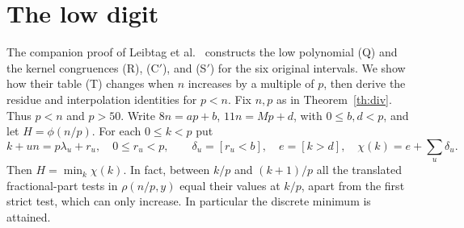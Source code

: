 \documentclass[11pt]{article}
\begin{document}
\section{The low digit}
The companion proof of Leibtag et al.\ \cite{LC} constructs the
low polynomial (Q) and the kernel congruences (R), (C$'$), and
(S$'$) for the six original intervals. We show how their table
(T) changes when $n$ increases by a multiple of $p$, then derive the residue and interpolation identities for $p<n$.
Fix $n,p$ as in Theorem~\ref{th:div}. Thus $p<n$ and $p>50$.
Write $8n=ap+b$, $11n=Mp+d$, with $0\le b,d<p$, and let
$H=\phi(n/p)$. For each $0\le k<p$ put
\[
 k+un=p\lambda_u+r_u,\quad 0\le r_u<p,\qquad
 \delta_u=[r_u<b],\quad e=[k>d],\quad \chi(k)=e+\sum_u\delta_u.
\]
Then $H=\min_k\chi(k)$. In fact, between $k/p$ and $(k+1)/p$
all the translated fractional-part tests in $\rho(n/p,y)$ equal
their values at $k/p$, apart from the first strict test, which can
only increase. In particular the discrete minimum is attained.
\end{document}
